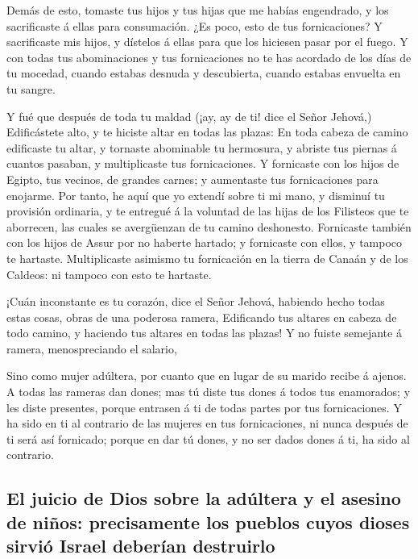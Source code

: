  Demás de esto, tomaste tus hijos y tus hijas que me
habías engendrado, y los sacrificaste á ellas para consumación. ¿Es
poco, esto de tus fornicaciones?  Y sacrificaste mis
hijos, y dístelos á ellas para que los hiciesen pasar por el fuego.
 Y con todas tus abominaciones y tus fornicaciones no te
has acordado de los días de tu mocedad, cuando estabas desnuda y
descubierta, cuando estabas envuelta en tu sangre.

 Y fué que después de toda tu maldad (¡ay, ay de ti! dice
el Señor Jehová,)  Edificástete alto, y te hiciste altar
en todas las plazas:  En toda cabeza de camino edificaste
tu altar, y tornaste abominable tu hermosura, y abriste tus piernas á
cuantos pasaban, y multiplicaste tus fornicaciones.  Y
fornicaste con los hijos de Egipto, tus vecinos, de grandes carnes; y
aumentaste tus fornicaciones para enojarme.  Por tanto,
he aquí que yo extendí sobre ti mi mano, y disminuí tu provisión
ordinaria, y te entregué á la voluntad de las hijas de los Filisteos que
te aborrecen, las cuales se avergüenzan de tu camino deshonesto.
 Fornicaste también con los hijos de Assur por no haberte
hartado; y fornicaste con ellos, y tampoco te hartaste. 
Multiplicaste asimismo tu fornicación en la tierra de Canaán y de los
Caldeos: ni tampoco con esto te hartaste.

 ¡Cuán inconstante es tu corazón, dice el Señor Jehová,
habiendo hecho todas estas cosas, obras de una poderosa ramera,
 Edificando tus altares en cabeza de todo camino, y
haciendo tus altares en todas las plazas! Y no fuiste semejante á
ramera, menospreciando el salario,

 Sino como mujer adúltera, por cuanto que en lugar de su
marido recibe á ajenos.  A todas las rameras dan dones;
mas tú diste tus dones á todos tus enamorados; y les diste presentes,
porque entrasen á ti de todas partes por tus fornicaciones.
 Y ha sido en ti al contrario de las mujeres en tus
fornicaciones, ni nunca después de ti será así fornicado; porque en dar
tú dones, y no ser dados dones á ti, ha sido al contrario.

\hypertarget{el-juicio-de-dios-sobre-la-aduxfaltera-y-el-asesino-de-niuxf1os-precisamente-los-pueblos-cuyos-dioses-sirviuxf3-israel-deberuxedan-destruirlo}{%
\subsection{El juicio de Dios sobre la adúltera y el asesino de niños:
precisamente los pueblos cuyos dioses sirvió Israel deberían
destruirlo}\label{el-juicio-de-dios-sobre-la-aduxfaltera-y-el-asesino-de-niuxf1os-precisamente-los-pueblos-cuyos-dioses-sirviuxf3-israel-deberuxedan-destruirlo}}

